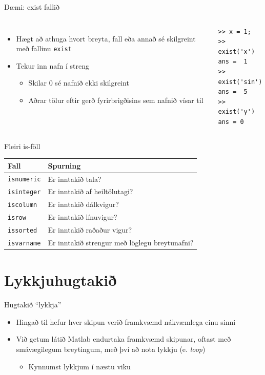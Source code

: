 \documentclass{beamer}
\begin{document}
\begin{frame}[fragile]{Dæmi: exist fallið}
\begin{columns}
\begin{itemize}
 \item Hægt að athuga hvort breyta, fall eða annað sé skilgreint með fallinu \texttt{exist}
 \item Tekur inn nafn í streng
 \begin{itemize}
  \item Skilar 0 sé nafnið ekki skilgreint
  \item Aðrar tölur eftir gerð fyrirbrigðisins sem nafnið vísar til
 \end{itemize}
\end{itemize}
\begin{verbatim}
>> x = 1;
>> exist('x')
ans =  1
>> exist('sin')
ans =  5
>> exist('y')
ans = 0
\end{verbatim}
\end{columns}
\end{frame}

\begin{frame}{Fleiri is-föll}
\begin{center}
\begin{tabular}{ll}
\toprule
Fall&Spurning\\
\midrule
\texttt{isnumeric}&Er inntakið tala?\\
\texttt{isinteger}&Er inntakið af heiltölutagi?\\
\texttt{iscolumn}&Er inntakið dálkvigur?\\
\texttt{isrow}&Er inntakið línuvigur?\\
\texttt{issorted}&Er inntakið raðaður vigur?\\
\texttt{isvarname}&Er inntakið strengur með löglegu breytunafni?\\
\bottomrule
\end{tabular}
\end{center}
\end{frame}

\section{Lykkjuhugtakið}

\begin{frame}{Hugtakið ``lykkja''}
\begin{itemize}
 \item Hingað til hefur hver skipun verið framkvæmd nákvæmlega einu sinni
 \item Við getum látið Matlab endurtaka framkvæmd skipunar, oftast með smávægilegum breytingum, með því að nota lykkju (e. \emph{loop})
 \begin{itemize}
  \item Kynnumst lykkjum í næstu viku
 \end{itemize}

\end{itemize}
\end{frame}
\end{document}
